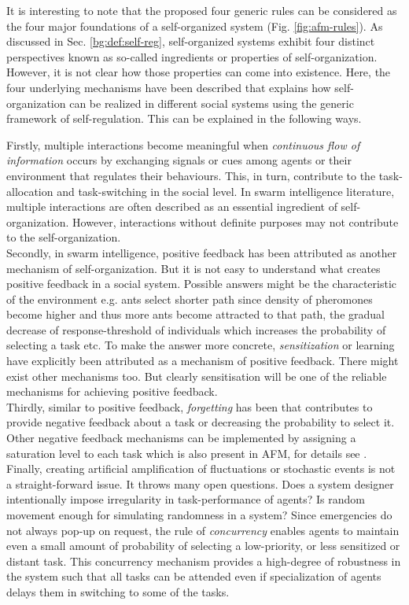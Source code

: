 It is interesting to note that the proposed four generic rules can be considered as  the four major foundations of a self-organized system (Fig.  \ref{fig:afm-rules}). As discussed in Sec. \ref{bg:def:self-reg},  self-organized systems exhibit four distinct perspectives known as so-called ingredients or properties of self-organization. However, it is not clear how those properties can come into existence. Here, the four underlying mechanisms have been described that explains how self-organization can be realized in different social systems using the generic framework of self-regulation. This can be explained in the following ways.

Firstly, multiple interactions become meaningful when {\em continuous flow of information} occurs  by exchanging signals or cues among agents or their environment  that regulates their behaviours. This, in turn, contribute to the task-allocation  and task-switching in the social level.  In swarm intelligence literature, multiple interactions are often described as an essential ingredient of self-organization. However, interactions without definite purposes may not contribute to the self-organization.\\
Secondly, in swarm intelligence, positive feedback has been attributed as another mechanism of  self-organization. But it is not easy to understand what creates positive feedback in a social system. Possible answers might be the characteristic of the environment e.g. ants select shorter path since density of pheromones become higher and thus more ants become attracted to that path, the gradual decrease of response-threshold of individuals which increases the probability of selecting a task etc.  To make the answer more concrete, {\em sensitization} or learning have explicitly been attributed as a mechanism of positive feedback. There might exist other mechanisms too. But clearly sensitisation will be one of the reliable mechanisms for achieving positive feedback.\\
Thirdly, similar to positive feedback,  {\em forgetting} has been that contributes to provide negative feedback about a task or decreasing the probability to select it. Other negative feedback mechanisms can be implemented by assigning a saturation level to each task which is also present in AFM, for details see .\\
Finally, creating  artificial amplification of fluctuations or stochastic events is not a straight-forward issue. It throws  many open questions. Does a system designer intentionally impose irregularity in task-performance of agents?  Is random movement  enough for simulating randomness in a system?
Since emergencies do not always pop-up on request, the rule of {\em concurrency} enables agents to  maintain even a small amount of probability of selecting a low-priority, or less sensitized or distant task. This concurrency mechanism provides a high-degree of robustness in the system such that all tasks can be attended even if specialization of agents delays them in switching to some of the tasks.
